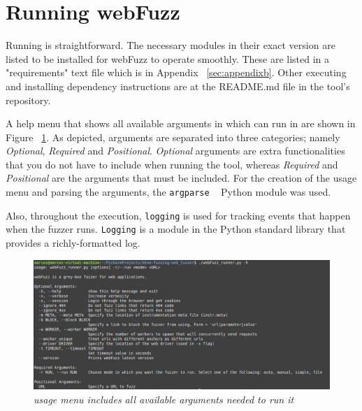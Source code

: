 \section{Running webFuzz}
Running \pname{} is straightforward. The necessary modules in their exact version are listed to be installed for webFuzz to operate smoothly. These are listed in a "requirements" text file which is in Appendix ~\ref{sec:appendixb}. Other executing and installing dependency instructions are at the README.md file in the tool's repository.

A help menu that shows all available arguments in which \pname{} can run in are shown in Figure ~\ref{fig:argparser_menu}. As depicted, arguments are separated into three categories; namely \emph{Optional}, \emph{Required} and \emph{Positional}. \emph{Optional} arguments are extra functionalities that you do not have to include when running the tool, whereas \emph{Required} and \emph{Positional} are the arguments that must be included. For the creation of the usage menu and parsing the arguments, the {\tt argparse} ~\cite{argparse} Python module was used.

Also, throughout the execution, {\tt logging} is used for tracking events that happen when the fuzzer runs. {\tt Logging} is a module in the Python standard library that provides a richly-formatted log.

\begin{figure}[ht]
 \centering
 \captionsetup{justification=centering}
 \includegraphics[width=\linewidth]{figures/argparser_menu.jpg}
 \caption[\pname{} usage menu]{\textit{\pname{} usage menu includes all available arguments needed to run it}}
 \label{fig:argparser_menu}
\end{figure}
